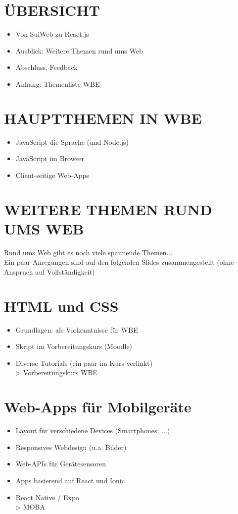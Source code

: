 \section*{ÜBERSICHT}
\begin{itemize}
  \item Von SuiWeb zu React.js
  \item Ausblick: Weitere Themen rund ums Web
  \item Abschluss, Feedback
  \item Anhang: Themenliste WBE
\end{itemize}

\section*{HAUPTTHEMEN IN WBE}
\begin{itemize}
  \item JavaScript die Sprache (und Node.js)
  \item JavaScript im Browser
  \item Client-seitige Web-Apps
\end{itemize}

\section*{WEITERE THEMEN RUND UMS WEB}
Rund ums Web gibt es noch viele spannende Themen...\\
Ein paar Anregungen sind auf den folgenden Slides zusammengestellt (ohne Anspruch auf Vollständigkeit)

\section*{HTML und CSS}
\begin{itemize}
  \item Grundlagen: als Vorkenntnisse für WBE
  \item Skript im Vorbereitungskurs (Moodle)
  \item Diverse Tutorials (ein paar im Kurs verlinkt)\\
$\triangleright$ Vorbereitungskurs WBE
\end{itemize}

\section*{Web-Apps für Mobilgeräte}
\begin{itemize}
  \item Layout für verschiedene Devices (Smartphones, ...)
  \item Responsives Webdesign (u.a. Bilder)
  \item Web-APIs für Gerätesensoren
  \item Apps basierend auf React und Ionic
  \item React Native / Expo\\
$\triangleright$ MOBA
\end{itemize}

